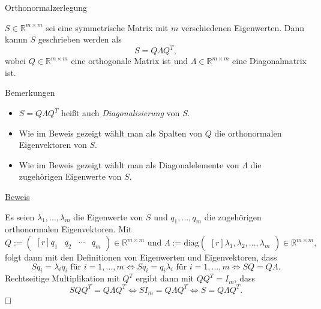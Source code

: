 \documentclass[
  8pt,
  ignorenonframetext,
]{beamer}
\providecommand{\tightlist}{%
  \setlength{\itemsep}{0pt}\setlength{\parskip}{0pt}}
\begin{document}
\begin{frame}{Orthonormalzerlegung}
\protect\hypertarget{orthonormalzerlegung-2}{}
\footnotesize
\begin{theorem}
\normalfont
$S \in \mathbb{R}^{m \times m}$ sei eine symmetrische Matrix mit $m$ verschiedenen
Eigenwerten. Dann kannn $S$
geschrieben werden als
\begin{equation}
S = Q \Lambda Q^T,
\end{equation}
wobei $Q \in \mathbb{R}^{m \times m}$ eine orthogonale Matrix ist und
$\Lambda \in \mathbb{R}^{m\times m}$ eine Diagonalmatrix ist.
\end{theorem}
\vspace{-1mm}

Bemerkungen \vspace{-1mm}

\begin{itemize}
\tightlist
\item
  \(S = Q \Lambda Q^T\) heißt auch \emph{Diagonalisierung} von \(S\).
\item
  Wie im Beweis gezeigt wählt man als Spalten von \(Q\) die
  orthonormalen Eigenvektoren von \(S\).
\item
  Wie im Beweis gezeigt wählt man als Diagonalelemente von \(\Lambda\)
  die zugehörigen Eigenwerte von \(S\).
\end{itemize}

\footnotesize

\underline{Beweis}

Es seien \(\lambda_1,...,\lambda_m\) die Eigenwerte von \(S\) und
\(q_1,...,q_m\) die zugehörigen orthonormalen Eigenvektoren. Mit
\begin{equation}
Q :=
\begin{pmatrix*}[r]
q_1 & q_2 & \cdots & q_m
\end{pmatrix*}
\in \mathbb{R}^{m \times m}
\mbox{ und }
\Lambda :=
\mbox{diag}\begin{pmatrix*}[r]
\lambda_1,\lambda_2,...,\lambda_m
\end{pmatrix*}
\in \mathbb{R}^{m \times m},
\end{equation} folgt dann mit den Definitionen von Eigenwerten und
Eigenvektoren, dass \begin{equation}
Sq_i = \lambda_i q_i \mbox{ für } i = 1,...,m
\Leftrightarrow
Sq_i = q_i \lambda_i \mbox{ für } i = 1,...,m
\Leftrightarrow
SQ = Q\Lambda.
\end{equation} Rechtseitige Multiplikation mit \(Q^T\) ergibt dann mit
\(QQ^T = I_m\), dass \begin{equation}
SQQ^T = Q \Lambda Q^T
\Leftrightarrow SI_m = Q \Lambda Q^T
\Leftrightarrow S    = Q \Lambda Q^T.
\end{equation} \(\hfill \Box\)
\end{frame}
\end{document}
